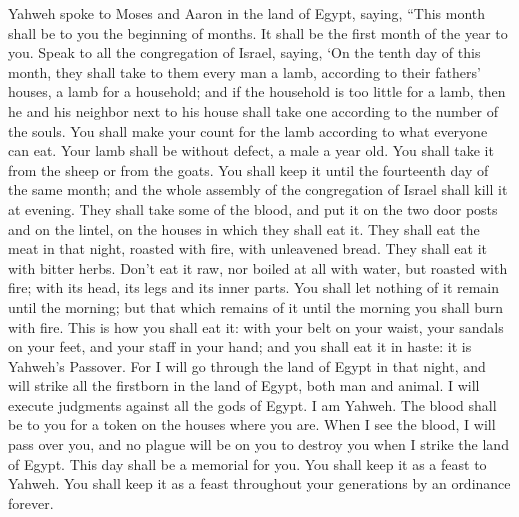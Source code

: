  Yahweh spoke to Moses and Aaron in the land of Egypt,
saying,  ``This month shall be to you the beginning of
months. It shall be the first month of the year to you. 
Speak to all the congregation of Israel, saying, `On the tenth day of
this month, they shall take to them every man a lamb, according to their
fathers' houses, a lamb for a household;  and if the
household is too little for a lamb, then he and his neighbor next to his
house shall take one according to the number of the souls. You shall
make your count for the lamb according to what everyone can eat.
 Your lamb shall be without defect, a male a year old. You
shall take it from the sheep or from the goats.  You shall
keep it until the fourteenth day of the same month; and the whole
assembly of the congregation of Israel shall kill it at evening.
 They shall take some of the blood, and put it on the two
door posts and on the lintel, on the houses in which they shall eat it.
 They shall eat the meat in that night, roasted with fire,
with unleavened bread. They shall eat it with bitter herbs. 
Don't eat it raw, nor boiled at all with water, but roasted with fire;
with its head, its legs and its inner parts.  You shall let
nothing of it remain until the morning; but that which remains of it
until the morning you shall burn with fire.  This is how
you shall eat it: with your belt on your waist, your sandals on your
feet, and your staff in your hand; and you shall eat it in haste: it is
Yahweh's Passover.  For I will go through the land of Egypt
in that night, and will strike all the firstborn in the land of Egypt,
both man and animal. I will execute judgments against all the gods of
Egypt. I am Yahweh.  The blood shall be to you for a token
on the houses where you are. When I see the blood, I will pass over you,
and no plague will be on you to destroy you when I strike the land of
Egypt.  This day shall be a memorial for you. You shall
keep it as a feast to Yahweh. You shall keep it as a feast throughout
your generations by an ordinance forever.

